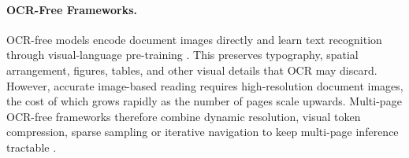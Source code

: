 \documentclass[11pt]{article}
\begin{document}
\paragraph{OCR-Free Frameworks.}
OCR-free models encode document images directly and learn text recognition through visual-language pre-training \cite{lee2023pix2struct, hu2024mplug}. This preserves typography, spatial arrangement, figures, tables, and other visual details that OCR may discard. However, accurate image-based reading requires high-resolution document images, the cost of which grows rapidly as the number of pages scale upwards. Multi-page OCR-free frameworks therefore combine dynamic resolution, visual token compression, sparse sampling or iterative navigation to keep multi-page inference tractable \cite{yu2024texthawk2, zheng2026doc}.

\end{document}
